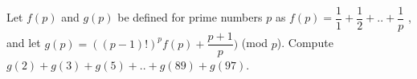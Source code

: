 Let $f(p)$ and $g(p)$ be defined for prime numbers $p$ as $f(p) = \dfrac{1}{1} + \dfrac{1}{2} + .. + \dfrac{1}{p}$ , and let $g(p) = ((p - 1)!)^pf(p) + \dfrac{p+1}{p} )$ (mod $p$). Compute $g(2) + g(3) + g(5) + ..+ g(89) + g(97)$.
